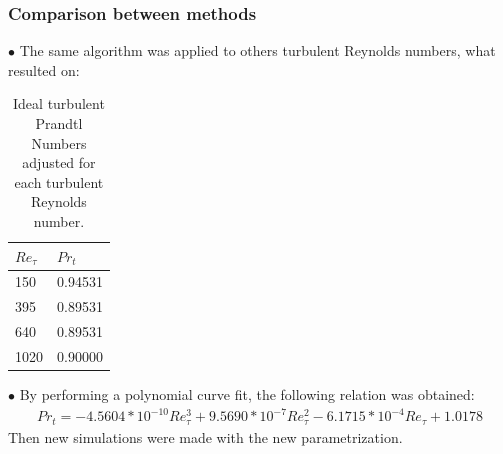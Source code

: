 \documentclass[xcolor=dvipsnames,8pt,aspectratio=34]{beamer}
\begin{document}
\begin{frame}
\frametitle{Comparison between methods}
$\bullet$ The same algorithm was applied to others turbulent Reynolds numbers, what resulted on:\\
\begin{table}[!h]
	\centering
	\caption{Ideal turbulent Prandtl Numbers adjusted for each turbulent Reynolds number.}
	\begin{tabular}{ll}
		\hline
		$Re_\tau$ & $Pr_t$\\
		\hline
		150  &   0.94531\\
		395  &   0.89531\\
		640  &   0.89531\\
		1020 &   0.90000\\ 
		\hline
	\end{tabular}
\end{table}
$\bullet$ By performing a polynomial curve fit, the following relation was obtained:
\begin{equation}
\begin{split}
Pr_t = -4.5604 * 10^{-10} Re_\tau^3 + 9.5690 * 10^{-7} Re_\tau^2 - 6.1715 *10 ^{-4} Re_\tau + 1.0178 
\end{split}
\end{equation}
Then new simulations were made with the new parametrization.

\end{frame}
\end{document}
